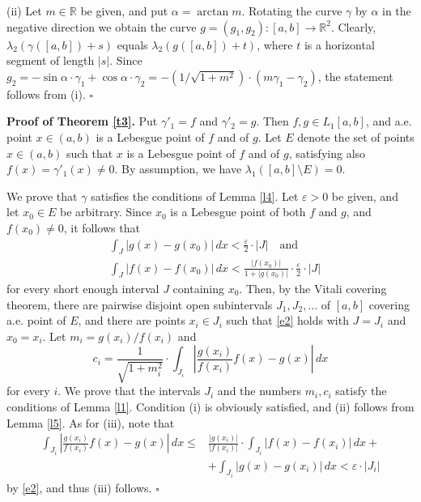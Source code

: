 \documentclass[12pt]{article}
\def\rr{{\mathbb R}}
\def\sik{{\rr}^2}
\def\se{\setminus}
\def\al{\alpha}
\def\ga{\gamma}
\def\ep{\varepsilon}
\def\la{\lambda}
\def\cd{\cdot}
\begin{document}
(ii) Let $m\in \rr$ be given, and put $\al =\arctan m$. Rotating the curve
$\ga$ by $\al$ in the negative direction we obtain the curve
$g =(g_1 ,g_2 )\colon [a,b] \to \sik$. Clearly, $\la _2 (\ga ([a,b])+s)$
equals $\la _2 (g([a,b])+t)$, where $t$ is a horizontal segment of length $|s|$.
Since $g_2 =-\sin \al \cd \ga _1 +\cos \al \cd \ga _2 =-(1/\sqrt{1+m^2}) \cd
(m\ga _1 -\ga _2 )$, the statement follows from (i). \hfill $\square$ 

{\bf Proof of Theorem \ref{t3}.}
Put $\ga '_1 =f$ and $\ga '_2 =g$. Then $f,g\in L_1 [a,b]$, and a.e. point
$x\in (a,b)$ is a Lebesgue point of $f$ and of $g$.
Let $E$ denote the set of points $x\in (a,b)$ such that $x$ is a Lebesgue
point of $f$ and of $g$, satisfying also $f(x)=\ga '_1 (x)\ne 0$.
By assumption, we have $\la _1 ([a,b] \se E)=0$.

We prove that $\ga$ satisfies the conditions of Lemma \ref{l4}. Let $\ep >0$
be given, and let $x_0 \in E$ be arbitrary. Since $x_0$ is a Lebesgue point
of both $f$ and $g$, and $f(x_0 )\ne 0$, it follows that
\begin{equation} \label{e2}
\begin{split}
&\int_J |g(x)-g(x_0 )| \, dx <\frac{\ep}{2} \cd |J| \quad \text{and} \\
&\int_J |f(x)-f(x_0 )| \, dx < \frac{|f(x_0 )|}{1+|g(x_0 )|} \cd 
\frac{\ep}{2} \cd |J|
\end{split}
\end{equation}
for every short enough interval $J$ containing $x_0$. Then, by the Vitali
covering theorem, there are pairwise disjoint open subintervals
$J_1 ,J_2 ,\ldots$ of $[a,b]$ covering a.e. point of $E$, and there are points
$x_i \in J_i$ such that \eqref{e2} holds with $J=J_i$ and $x_0 =x_i$.
Let $m_i =g(x_i )/f(x_i )$ and
$$c_i =\frac{1}{\sqrt{1+m_i^2}} \cd 
\int_{J_i} \left| \frac{g(x_i )}{f(x_i )} f(x)-g(x) \right| \, dx$$
for every $i$. We prove that the intervals $J_i$ and the numbers $m_i ,c_i$
satisfy the conditions of Lemma \ref{l1}. Condition (i) is obviously
satisfied, and (ii) follows from Lemma \ref{l5}. As for (iii), note that
\begin{align*}
\int_{J_i}  \left| \frac{g(x_i )}{f(x_i )} f(x)-g(x) \right| \, dx  \le & 
 \frac{|g(x_i )|}{|f(x_i )|} \cd \int_{J_i} | f(x)-f(x_i )| \, dx +\\
&+ \int_{J_i} |g(x)-g(x_i )| \, dx <\ep \cd |J_i |
\end{align*}
by \eqref{e2}, and thus (iii) follows. \hfill $\square$ 
\end{document}
